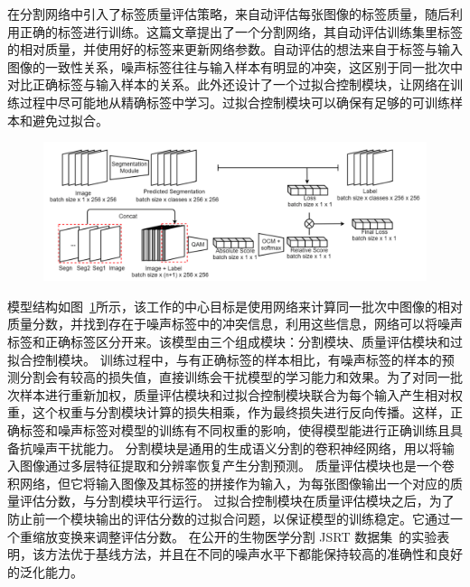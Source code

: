 \citet{Zhu2019PickandLearnAQ} 在分割网络中引入了标签质量评估策略，来自动评估每张图像的标签质量，随后利用正确的标签进行训练。这篇文章提出了一个分割网络，其自动评估训练集里标签的相对质量，并使用好的标签来更新网络参数。自动评估的想法来自于标签与输入图像的一致性关系，噪声标签往往与输入样本有明显的冲突，这区别于同一批次中对比正确标签与输入样本的关系。此外还设计了一个过拟合控制模块，让网络在训练过程中尽可能地从精确标签中学习。过拟合控制模块可以确保有足够的可训练样本和避免过拟合。
    \begin{figure}[tbp]
        \centering 
        \includegraphics[width=1.0\textwidth]{img/c2/rel_c1.png}
        \label{c2_fig11}
    \end{figure}
模型结构如图~\ref{c2_fig11}所示，该工作的中心目标是使用网络来计算同一批次中图像的相对质量分数，并找到存在于噪声标签中的冲突信息，利用这些信息，网络可以将噪声标签和正确标签区分开来。该模型由三个组成模块：分割模块、质量评估模块和过拟合控制模块。
训练过程中，与有正确标签的样本相比，有噪声标签的样本的预测分割会有较高的损失值，直接训练会干扰模型的学习能力和效果。为了对同一批次样本进行重新加权，质量评估模块和过拟合控制模块联合为每个输入产生相对权重，这个权重与分割模块计算的损失相乘，作为最终损失进行反向传播。这样，正确标签和噪声标签对模型的训练有不同权重的影响，使得模型能进行正确训练且具备抗噪声干扰能力。
分割模块是通用的生成语义分割的卷积神经网络，用以将输入图像通过多层特征提取和分辨率恢复产生分割预测。
质量评估模块也是一个卷积网络，但它将输入图像及其标签的拼接作为输入，为每张图像输出一个对应的质量评估分数，与分割模块平行运行。
过拟合控制模块在质量评估模块之后，为了防止前一个模块输出的评估分数的过拟合问题，以保证模型的训练稳定。它通过一个重缩放变换来调整评估分数。
在公开的生物医学分割 JSRT 数据集~\cite{Shiraishi2000DevelopmentOA}的实验表明，该方法优于基线方法，并且在不同的噪声水平下都能保持较高的准确性和良好的泛化能力。


